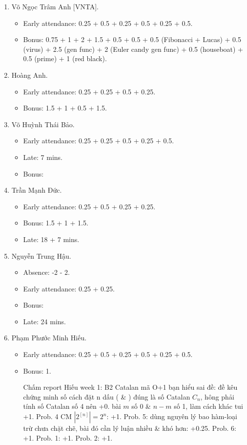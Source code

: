 \documentclass{article}
\begin{document}
\begin{enumerate}
	\item {\sc Võ Ngọc Trâm Anh [VNTA].}
	\begin{itemize}
		\item Early attendance: 0.25 + 0.5 + 0.25 + 0.5 + 0.25 + 0.5.
		\item Bonus: 0.75 + 1 + 2 + 1.5 + 0.5 + 0.5 + 0.5 (Fibonacci + Lucas) + 0.5 (virus) + 2.5 (gen func) + 2 (Euler candy gen func) + 0.5 (houseboat) + 0.5 (prime) + 1 (red black).
	\end{itemize}
	\item {\sc Hoàng Anh.}
	\begin{itemize}
		\item Early attendance: 0.25 + 0.25 + 0.5 + 0.25.
		\item Bonus: 1.5 + 1 + 0.5 + 1.5.
	\end{itemize}
	\item {\sc Võ Huỳnh Thái Bảo.}
	\begin{itemize}
		\item Early attendance: 0.25 + 0.25 + 0.5 + 0.25 + 0.5.
		\item Late: 7 mins.
		\item Bonus: 
	\end{itemize}
	\item {\sc Trần Mạnh Đức.}
	\begin{itemize}
		\item Early attendance: 0.25 + 0.5 + 0.25 + 0.25.
		\item Bonus: 1.5 + 1 + 1.5.
		\item Late: 18 + 7 mins.
	\end{itemize}
	\item {\sc Nguyễn Trung Hậu.}
	\begin{itemize}
		\item Absence: -2 - 2.
		\item Early attendance: 0.25 + 0.25.
		\item Bonus:
		\item Late: 24 mins.
	\end{itemize}
	\item {\sc Phạm Phước Minh Hiếu.}
	\begin{itemize}
		\item Early attendance: 0.25 + 0.5 + 0.25 + 0.5 + 0.25 + 0.5.
		\item Bonus: 1.		
		
		Chấm report Hiếu week 1: B2 Catalan mã O+1 bạn hiểu sai đề: đề kêu chứng minh số cách đặt n dấu ( \& ) đúng là số Catalan $C_n$, hông phải tính số Catalan số 4 nên +0. bài $m$ số 0 \& $n - m$ số 1, làm cách khác tui +1. Prob. 4 CM $|2^[n]| =2^n$: +1. Prob. 5: dùng nguyên lý bao hàm-loại trừ chưa chặt chẽ, bài đó cần lý luận nhiều \& khó hơn: +0.25. Prob. 6: +1. Prob. 1: +1. Prob. 2: +1.
		

\end{itemize}
\end{enumerate}
\end{document}
